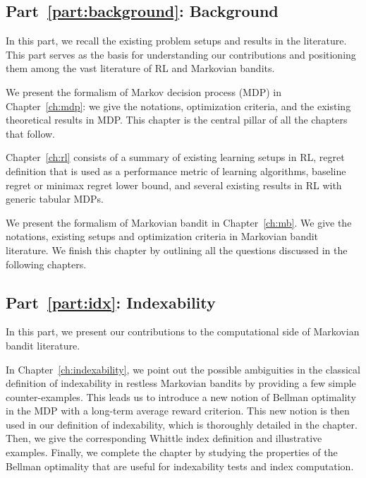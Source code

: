 \subsection{Part~{\ref{part:background}}: Background}

In this part, we recall the existing problem setups and results in the literature.
This part serves as the basis for understanding our contributions and positioning them among the vast literature of RL and Markovian bandits.

We present the formalism of Markov decision process (MDP) in Chapter~\ref{ch:mdp}: we give the notations, optimization criteria, and the existing theoretical results in MDP.
This chapter is the central pillar of all the chapters that follow.

Chapter~\ref{ch:rl} consists of a summary of existing learning setups in RL, regret definition that is used as a performance metric of learning algorithms, baseline regret or minimax regret lower bound, and several existing results in RL with generic tabular MDPs.

We present the formalism of Markovian bandit in Chapter~\ref{ch:mb}. We give the notations, existing setups and optimization criteria in Markovian bandit literature.
We finish this chapter by outlining all the questions discussed in the following chapters.

\subsection{Part~{\ref{part:idx}}: Indexability}

In this part, we present our contributions to the computational side of Markovian bandit literature.

In Chapter~\ref{ch:indexability}, we point out the possible ambiguities in the classical definition of indexability in restless Markovian bandits by providing a few simple counter-examples.
This leads us to introduce a new notion of Bellman optimality in the MDP with a long-term average reward criterion.
This new notion is then used in our definition of indexability, which is thoroughly detailed in the chapter.
Then, we give the corresponding Whittle index definition and illustrative examples.
Finally, we complete the chapter by studying the properties of the Bellman optimality that are useful for indexability tests and index computation.

